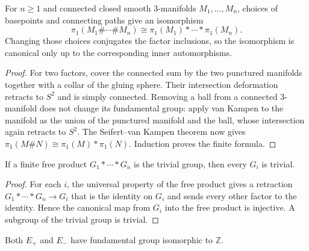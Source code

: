 \begin{theorem}
\label{thm:connected-sum-fundamental-group}
\notready
For $n\ge1$ and connected closed smooth $3$-manifolds
$M_1,\ldots,M_n$, choices of basepoints and connecting paths give an
isomorphism
\[
 \pi_1(M_1\#\cdots\#M_n)
 \cong \pi_1(M_1)*\cdots*\pi_1(M_n).
\]
Changing those choices conjugates the factor inclusions, so the isomorphism
is canonical only up to the corresponding inner automorphisms.
\end{theorem}

\begin{proof}
For two factors, cover the connected sum by the two punctured manifolds
together with a collar of the gluing sphere.  Their intersection deformation
retracts to $S^2$ and is simply connected.  Removing a ball from a connected
$3$-manifold does not change its fundamental group: apply van Kampen to the
manifold as the union of the punctured manifold and the ball, whose
intersection again retracts to $S^2$.  The Seifert--van Kampen theorem now
gives $\pi_1(M\#N)\cong\pi_1(M)*\pi_1(N)$.  Induction proves the finite formula.
\end{proof}

\begin{lemma}
\label{lem:trivial-free-product-factors}
\leanok
If a finite free product $G_1*\cdots*G_n$ is the trivial group, then every
$G_i$ is trivial.
\end{lemma}

\begin{proof}
For each $i$, the universal property of the free product gives a retraction
$G_1*\cdots*G_n\to G_i$ that is the identity on $G_i$ and sends every other
factor to the identity.  Hence the canonical map from $G_i$ into the free
product is injective.  A subgroup of the trivial group is trivial.
\end{proof}

\begin{lemma}
\label{lem:sphere-bundle-fundamental-group}
\leanok
Both $E_+$ and $E_-$ have fundamental group isomorphic to $\mathbb Z$.
\end{lemma}

